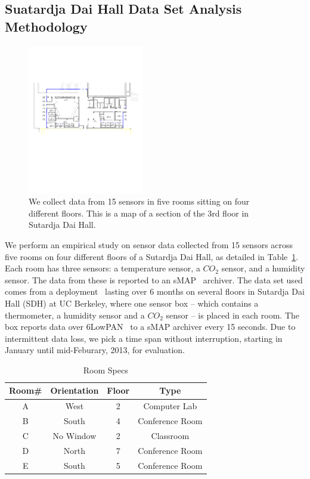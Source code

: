 \subsection{Suatardja Dai Hall Data Set Analysis Methodology}
\begin{figure}[h!]
\centering
  \includegraphics[width=0.45\textwidth]{figs/SDH3_crop}
\caption{We collect data from 15 sensors in five rooms sitting on four different floors. This is a map of a section of the 3rd floor
in Sutardja Dai Hall.}
\label{fig:sdh}
\end{figure}

We perform an empirical study on sensor data collected from 15 sensors across five rooms on four different floors of a Sutardja Dai Hall, 
as detailed in Table~\ref{table:roomspec}. 
Each room has three sensors: a temperature sensor, a $CO_{2}$ sensor,  and a humidity sensor. 
The data from these is reported to an sMAP~\cite{smap} archiver. The data set used comes from a deployment~\cite{Jay} lasting 
over 6 months on several floors in Sutardja Dai Hall (SDH) at UC Berkeley, where one sensor box -- which contains a thermometer, 
a humidity sensor and a $CO_{2}$ sensor -- is placed in each room. The box reports data over 6LowPAN~\cite{6lowpan} to a sMAP archiver 
every 15 seconds. 
Due to intermittent data loss, we pick a time span without interruption, starting in January until mid-Feburary, 2013, for evaluation.

\begin{table}[ht!]
\caption{Room Specs}
\centering %
\begin{tabular}{c c c c}%
\hline %
Room\# & Orientation & Floor & Type \\ %
\hline\hline %
A & West & 2 & Computer Lab \\ %
B & South & 4 & Conference Room \\
C & No Window & 2 & Classroom \\
D & North & 7 & Conference Room \\
E & South & 5 & Conference Room \\ %
\hline %
\end{tabular}
\label{table:roomspec} %
\end{table}


